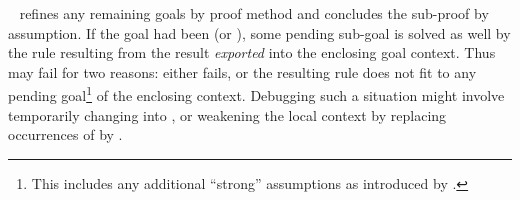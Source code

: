 \begin{isabellebody}
\begin{isamarkuptext}
\begin{description}
  \item \hyperlink{command.qed}{\mbox{}}~ refines any remaining goals by
  proof method  and concludes the sub-proof by assumption.
  If the goal had been  (or ), some
  pending sub-goal is solved as well by the rule resulting from the
  result \emph{exported} into the enclosing goal context.  Thus  may fail for two reasons: either  fails, or the
  resulting rule does not fit to any pending goal\footnote{This
  includes any additional ``strong'' assumptions as introduced by
  \hyperlink{command.assume}{\mbox{}}.} of the enclosing context.  Debugging such a
  situation might involve temporarily changing \hyperlink{command.show}{\mbox{}} into
  \hyperlink{command.have}{\mbox{}}, or weakening the local context by replacing
  occurrences of \hyperlink{command.assume}{\mbox{}} by \hyperlink{command.presume}{\mbox{}}.
  

\end{description}
\end{isamarkuptext}
\end{isabellebody}
